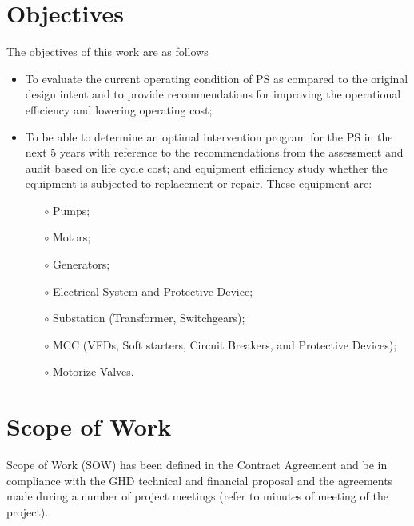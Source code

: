 \section{Objectives}
The objectives of this work are as follows
\begin{itemize}
	\item To evaluate the current operating condition of PS as compared to the original design intent and to provide recommendations for improving the operational efficiency and lowering operating cost;
	\item To be able to determine an optimal intervention program for the PS in the next 5 years with reference to the recommendations from the assessment and audit based on life cycle cost; and equipment efficiency study whether the equipment is subjected to replacement or repair. These equipment are:
	\begin{itemize}
		\item[$\circ$] Pumps;
		\item[$\circ$] Motors;
		\item[$\circ$] Generators;
		\item[$\circ$] Electrical System and Protective Device;
		\item[$\circ$] Substation (Transformer, Switchgears);
		\item[$\circ$] MCC (VFDs, Soft starters, Circuit Breakers, and Protective Devices);
		\item[$\circ$] Motorize Valves.	
	\end{itemize}
\end{itemize}

\section{Scope of Work}
Scope of Work (SOW) has been defined in the Contract Agreement and be in compliance with the GHD technical and financial proposal and the agreements made during a number of project meetings (refer to minutes of meeting of the project). 

%


